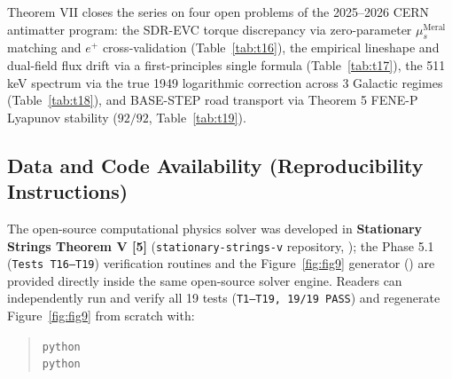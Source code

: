 \documentclass[12pt,a4paper]{article}
\begin{document}
Theorem VII closes the series on four open problems of the 2025--2026 CERN antimatter program: the SDR-EVC torque discrepancy via zero-parameter $\mu_s^{\mathrm{Meral}}$ matching and $e^+$ cross-validation (Table~\ref{tab:t16}), the empirical lineshape and dual-field flux drift via a first-principles single formula (Table~\ref{tab:t17}), the 511 keV spectrum via the true 1949 logarithmic correction across 3 Galactic regimes (Table~\ref{tab:t18}), and BASE-STEP road transport via Theorem 5 FENE-P Lyapunov stability ($92/92$, Table~\ref{tab:t19}).

\subsection*{Data and Code Availability (Reproducibility Instructions)}

The open-source computational physics solver was developed in \textbf{Stationary Strings Theorem V [5]} (\texttt{stationary-strings-v} repository, ); the Phase 5.1 (\texttt{Tests T16--T19}) verification routines and the Figure~\ref{fig:fig9} generator () are provided directly inside the same open-source solver engine. Readers can independently run and verify all 19 tests (\texttt{T1--T19, 19/19 PASS}) and regenerate Figure~\ref{fig:fig9} from scratch with:
\begin{quote}
\small
\texttt{python}  \\
\texttt{python} 
\end{quote}
\end{document}

